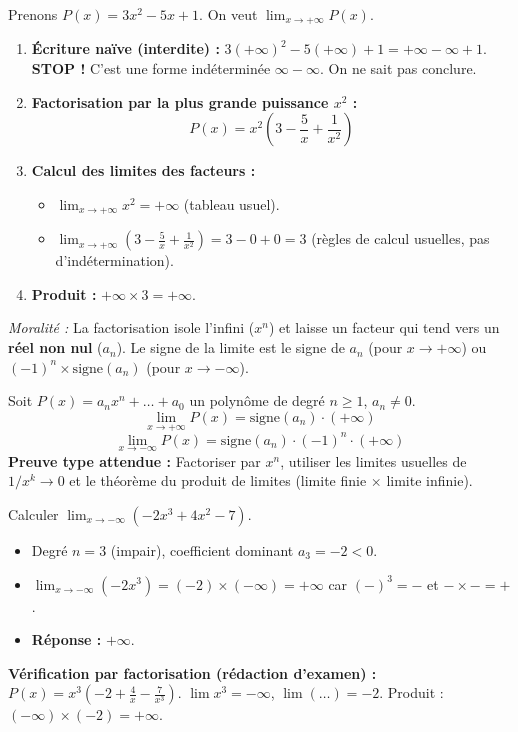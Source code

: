 \documentclass[11pt]{article}
\newcommand{\cle}[1]{{\popxbold\color{popdark}#1}}
\begin{document}
\begin{experience}
Prenons $P(x) = 3x^2 - 5x + 1$. On veut $\lim_{x \to +\infty} P(x)$.
\begin{enumerate}
    \item \textbf{Écriture naïve (interdite) :} $3(+\infty)^2 - 5(+\infty) + 1 = +\infty - \infty + 1$. \textbf{STOP !} C'est une \cle{forme indéterminée} $\infty - \infty$. On ne sait pas conclure.
    \item \textbf{Factorisation par la plus grande puissance $x^2$ :}
    \[ P(x) = x^2 \left( 3 - \frac{5}{x} + \frac{1}{x^2} \right) \]
    \item \textbf{Calcul des limites des facteurs :}
    \begin{itemize}
        \item $\lim_{x \to +\infty} x^2 = +\infty$ (tableau usuel).
        \item $\lim_{x \to +\infty} \left( 3 - \frac{5}{x} + \frac{1}{x^2} \right) = 3 - 0 + 0 = 3$ (règles de calcul usuelles, pas d'indétermination).
    \end{itemize}
    \item \textbf{Produit :} $+\infty \times 3 = +\infty$.
\end{enumerate}
\emph{Moralité :} La factorisation isole l'infini ($x^n$) et laisse un facteur qui tend vers un \textbf{réel non nul} ($a_n$). Le signe de la limite est le signe de $a_n$ (pour $x \to +\infty$) ou $(-1)^n \times \text{signe}(a_n)$ (pour $x \to -\infty$).
\end{experience}

\begin{propriete}
Soit $P(x) = a_n x^n + \dots + a_0$ un polynôme de degré $n \ge 1$, $a_n \neq 0$.
\[ \lim_{x \to +\infty} P(x) = \text{signe}(a_n) \cdot (+\infty) \]
\[ \lim_{x \to -\infty} P(x) = \text{signe}(a_n) \cdot (-1)^n \cdot (+\infty) \]
\textbf{Preuve type attendue :} Factoriser par $x^n$, utiliser les limites usuelles de $1/x^k \to 0$ et le théorème du produit de limites (limite finie $\times$ limite infinie).
\end{propriete}

\begin{exemplebox}
Calculer $\lim_{x \to -\infty} ( -2x^3 + 4x^2 - 7 )$.
\begin{itemize}
    \item Degré $n=3$ (impair), coefficient dominant $a_3 = -2 < 0$.
    \item $\lim_{x \to -\infty} (-2x^3) = (-2) \times (-\infty) = +\infty$ car $(-)^3 = -$ et $- \times - = +$.
    \item \textbf{Réponse :} $+\infty$.
\end{itemize}
\textbf{Vérification par factorisation (rédaction d'examen) :}
$P(x) = x^3(-2 + \frac{4}{x} - \frac{7}{x^3})$. $\lim x^3 = -\infty$, $\lim (\dots) = -2$. Produit : $(-\infty) \times (-2) = +\infty$.
\end{exemplebox}
\end{document}
